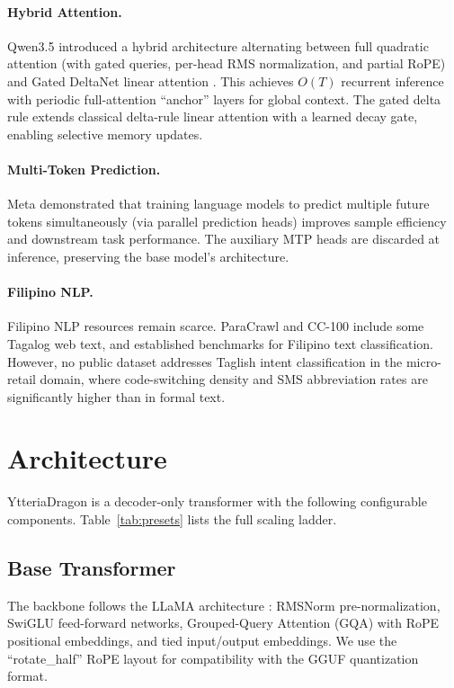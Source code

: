 \documentclass[11pt,a4paper]{article}
\begin{document}
\paragraph{Hybrid Attention.}
Qwen3.5 \citep{qwen2025qwen3} introduced a hybrid architecture alternating
between full quadratic attention (with gated queries, per-head RMS normalization,
and partial RoPE) and Gated DeltaNet linear attention
\citep{yang2024gated}. This achieves $O(T)$ recurrent inference with periodic
full-attention ``anchor'' layers for global context. The gated delta rule
extends classical delta-rule linear attention with a learned decay gate,
enabling selective memory updates.

\paragraph{Multi-Token Prediction.}
Meta \citep{gloeckle2024better} demonstrated that training language models to
predict multiple future tokens simultaneously (via parallel prediction heads)
improves sample efficiency and downstream task performance. The auxiliary MTP
heads are discarded at inference, preserving the base model's architecture.

\paragraph{Filipino NLP.}
Filipino NLP resources remain scarce. ParaCrawl and CC-100 include some
Tagalog web text, and \citet{cruz2020establishing} established benchmarks
for Filipino text classification. However, no public dataset addresses
Taglish intent classification in the micro-retail domain, where code-switching
density and SMS abbreviation rates are significantly higher than in formal text.

\section{Architecture}
\label{sec:architecture}

YtteriaDragon is a decoder-only transformer with the following configurable
components. Table~\ref{tab:presets} lists the full scaling ladder.

\subsection{Base Transformer}

The backbone follows the LLaMA architecture \citep{touvron2023llama}: RMSNorm
pre-normalization, SwiGLU feed-forward networks, Grouped-Query Attention (GQA)
with RoPE positional embeddings, and tied input/output embeddings. We use the
``rotate\_half'' RoPE layout for compatibility with the GGUF quantization
format.
\end{document}
